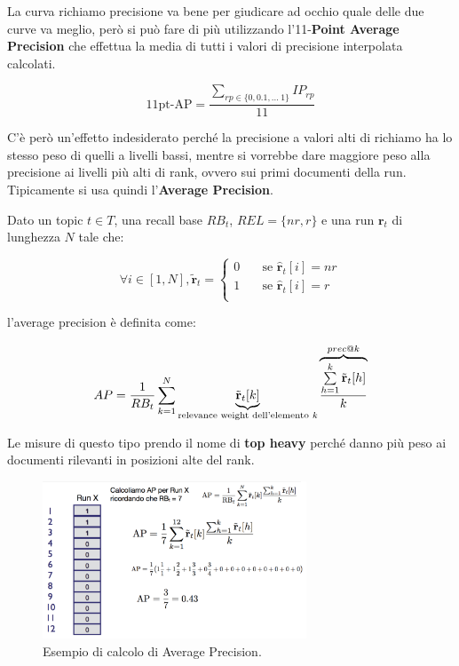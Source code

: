 La curva richiamo precisione va bene per giudicare ad occhio quale delle due curve va meglio, però si può fare di più utilizzando l'11-\textbf{Point Average Precision} che effettua la media di tutti i valori di precisione interpolata calcolati.

$$
\text{11pt-AP} = \frac{\sum_{rp\in\{0,0.1,\ldots \ 1 \}}IP_{rp}}{11}
$$

C'è però un'effetto indesiderato perché la precisione a valori alti di richiamo ha lo stesso peso di quelli a livelli bassi, mentre si vorrebbe dare maggiore peso alla precisione ai livelli più alti di rank, ovvero sui primi documenti della run.
Tipicamente si usa quindi l'\textbf{Average Precision}.

Dato un topic $t \in T$, una recall base $RB_t$, $REL =\{ nr, r \}$ e una run $\mathbf{r}_t$ di lunghezza $N$ tale che:

$$
\forall i \in [1, N], \tilde{\mathbf{r}}_t = \begin{cases}
0 \quad &\text{se } \hat{\mathbf{r}}_t[i] = nr \\
1 \quad &\text{se } \hat{\mathbf{r}}_t[i] = r \\
\end{cases}
$$

\noindent l'average precision è definita come:

$$
AP = \frac{1}{RB_t}\sum\limits_{k=1}^{N} \underbrace{\tilde{\mathbf{r}}_t[k]}_{\text{relevance weight dell'elemento \textit{k}}} \overbrace{\frac{\sum\limits_{h=1}^{k} \tilde{\mathbf{r}}_t[h]}{k}}^{prec@k}
$$

Le misure di questo tipo prendo il nome di \textbf{top heavy} perché danno più peso ai documenti rilevanti in posizioni alte del rank.

\begin{figure}[htbp]
	\centering
	\includegraphics[width=0.7\textwidth]{images/l15-fig-7.png}
	\caption{Esempio di calcolo di Average Precision.}
\end{figure}

